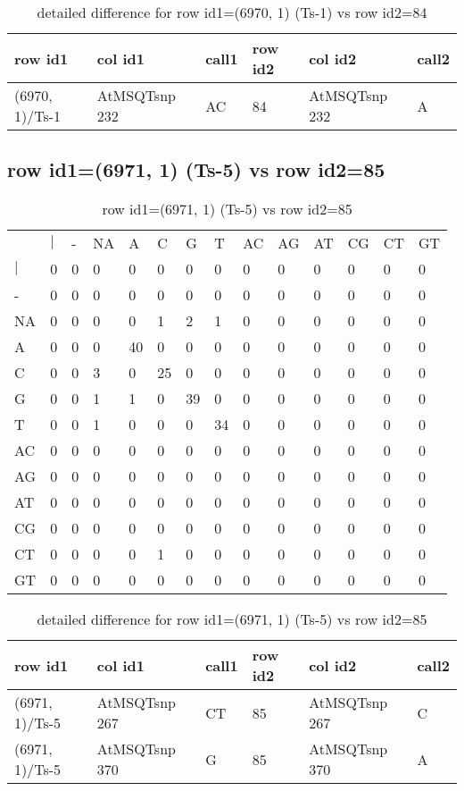 \begin{center}
\begin{longtable}{|l|l|l|l|l|l|}
\caption{detailed difference for row id1=(6970, 1) (Ts-1) vs row id2=84} \label{table_dm189}\\
\hline
row id1&col id1&call1&row id2&col id2&call2\\
\hline
(6970, 1)/Ts-1&AtMSQTsnp 232&AC&84&AtMSQTsnp 232&A\\
\hline
\end{longtable}
\end{center}

\subsection{row id1=(6971, 1) (Ts-5) vs row id2=85}
\begin{center}
\begin{longtable}{|l|l|l|l|l|l|l|l|l|l|l|l|l|l|}
\caption{row id1=(6971, 1) (Ts-5) vs row id2=85} \label{table_dm190}\\
\hline
\\
\hline
&$|$&-&NA&A&C&G&T&AC&AG&AT&CG&CT&GT\\
$|$&0&0&0&0&0&0&0&0&0&0&0&0&0\\
-&0&0&0&0&0&0&0&0&0&0&0&0&0\\
NA&0&0&0&0&1&2&1&0&0&0&0&0&0\\
A&0&0&0&40&0&0&0&0&0&0&0&0&0\\
C&0&0&3&0&25&0&0&0&0&0&0&0&0\\
G&0&0&1&1&0&39&0&0&0&0&0&0&0\\
T&0&0&1&0&0&0&34&0&0&0&0&0&0\\
AC&0&0&0&0&0&0&0&0&0&0&0&0&0\\
AG&0&0&0&0&0&0&0&0&0&0&0&0&0\\
AT&0&0&0&0&0&0&0&0&0&0&0&0&0\\
CG&0&0&0&0&0&0&0&0&0&0&0&0&0\\
CT&0&0&0&0&1&0&0&0&0&0&0&0&0\\
GT&0&0&0&0&0&0&0&0&0&0&0&0&0\\
\hline
\end{longtable}
\end{center}

\begin{center}
\begin{longtable}{|l|l|l|l|l|l|}
\caption{detailed difference for row id1=(6971, 1) (Ts-5) vs row id2=85} \label{table_dm191}\\
\hline
row id1&col id1&call1&row id2&col id2&call2\\
\hline
(6971, 1)/Ts-5&AtMSQTsnp 267&CT&85&AtMSQTsnp 267&C\\
(6971, 1)/Ts-5&AtMSQTsnp 370&G&85&AtMSQTsnp 370&A\\
\hline
\end{longtable}
\end{center}

